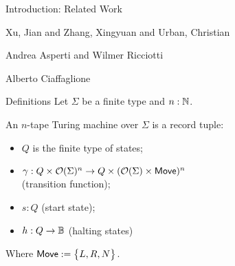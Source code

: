 \begin{frame}{Introduction: Related Work}
  \footnotesize
  \begin{thebibliography}{10}
    \beamertemplatearticlebibitems%
    \bibitem{}
    Xu, Jian and Zhang, Xingyuan and Urban, Christian

    \bibitem{}
    Andrea Asperti and Wilmer Ricciotti

    \bibitem{}
    Alberto Ciaffaglione
  \end{thebibliography}
\end{frame}


\begin{frame}{Definitions}
  Let $\Sigma$ be a finite type and $n:\mathbb{N}$.
  \begin{definition}
    An $n$-tape Turing machine over $\Sigma$ is a record tuple:
    \begin{itemize}
      \item $Q$ is the finite type of states;
      \item $\gamma : Q \times \mathcal{O}(\Sigma)^n \rightarrow Q \times (\mathcal{O}(\Sigma) \times \textsf{Move})^n$
        \\ (transition function);
      \item $s:Q$ (start state);
      \item $h : Q \rightarrow \mathbb{B}$ (halting states)
    \end{itemize}
    Where $\textsf{Move} := \bigl\{ L, R, N \bigr \}$.
  \end{definition}
\end{frame}

